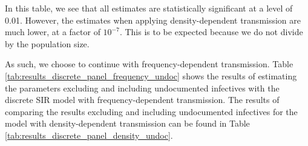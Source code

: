 \documentclass[12pt]{article}
\begin{document}
	In this table, we see that all estimates are statistically significant at a level of 0.01. However, the estimates when applying density-dependent transmission are much lower, at a factor of $10^{-7}$. This is to be expected because we do not divide by the population size.
	
	As such, we choose to continue with frequency-dependent transmission. Table \ref{tab:results_discrete_panel_frequency_undoc} shows the results of estimating the parameters excluding and including undocumented infectives with the discrete SIR model with frequency-dependent transmission. The results of comparing the results excluding and including undocumented infectives for the model with density-dependent transmission can be found in Table \ref{tab:results_discrete_panel_density_undoc}. \\
	
\end{document}
